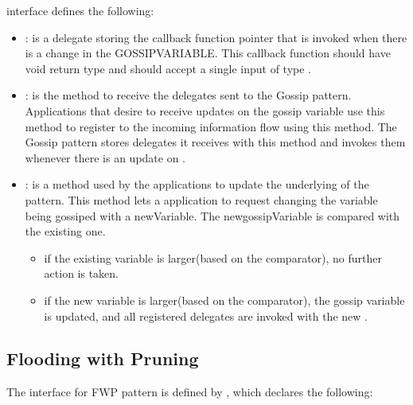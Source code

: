  interface defines the following:
\begin{itemize}
		
	\item {} : is a delegate storing the callback function pointer that is invoked when there is a change in the GOSSIPVARIABLE. This callback function should have void return type and should accept a single input of type .
	

	
	\item  {} : is the method to receive the delegates sent to the Gossip pattern. Applications that desire to receive updates on the gossip variable use this method to register to the incoming information flow using this method. The Gossip pattern stores delegates it receives with this method and invokes them whenever there is an update on .
	
	
	\item  {} : is a method used by the applications to update the underlying  of the pattern.
	This method lets a application to request changing the variable being gossiped with a newVariable. 
	The newgossipVariable is compared with the existing one. 
	
	\begin{itemize}
		\item 	if the existing variable is larger(based on the comparator), no further action is taken. 
		\item   if the new variable is larger(based on the comparator), the gossip variable is updated, and all registered delegates are invoked with the new .
	\end{itemize}
	
\end{itemize}


%

\subsection{Flooding with Pruning}

The interface for FWP pattern is defined by , which declares the following:

